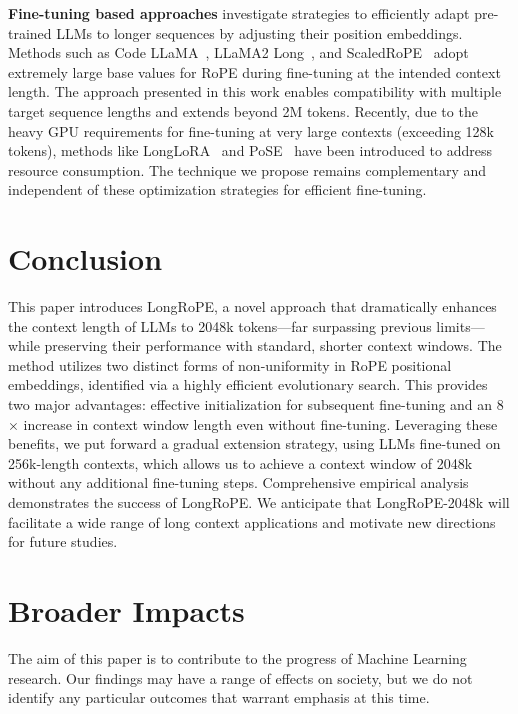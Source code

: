 \textbf{Fine-tuning based approaches} investigate strategies to efficiently adapt pre-trained LLMs to longer sequences by adjusting their position embeddings. Methods such as Code LLaMA~\cite{codellama}, LLaMA2 Long~\cite{xiong2023effective}, and ScaledRoPE~\cite{liu2023scaling} adopt extremely large base values for RoPE during fine-tuning at the intended context length. The approach presented in this work enables compatibility with multiple target sequence lengths and extends beyond 2M tokens. Recently, due to the heavy GPU requirements for fine-tuning at very large contexts (exceeding 128k tokens), methods like LongLoRA~\cite{longlora} and PoSE~\cite{zhu2023pose} have been introduced to address resource consumption. The technique we propose remains complementary and independent of these optimization strategies for efficient fine-tuning.

\section{Conclusion}

This paper introduces LongRoPE, a novel approach that dramatically enhances the context length of LLMs to 2048k tokens—far surpassing previous limits—while preserving their performance with standard, shorter context windows. The method utilizes two distinct forms of non-uniformity in RoPE positional embeddings, identified via a highly efficient evolutionary search. This provides two major advantages: effective initialization for subsequent fine-tuning and an 8$\times$ increase in context window length even without fine-tuning. Leveraging these benefits, we put forward a gradual extension strategy, using LLMs fine-tuned on 256k-length contexts, which allows us to achieve a context window of 2048k without any additional fine-tuning steps. Comprehensive empirical analysis demonstrates the success of LongRoPE. We anticipate that LongRoPE-2048k will facilitate a wide range of long context applications and motivate new directions for future studies.

\section*{Broader Impacts} The aim of this paper is to contribute to the progress of Machine Learning research. Our findings may have a range of effects on society, but we do not identify any particular outcomes that warrant emphasis at this time.

	\balance

